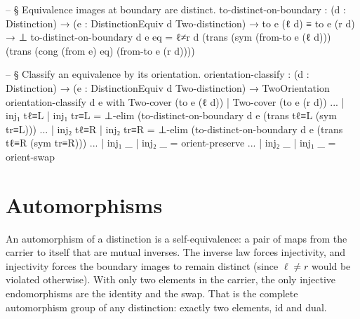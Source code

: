 \documentclass[11pt,a4paper]{book}
\def\texttt#1{#1}%
\begin{document}
\begin{code}
-- § Equivalence images at boundary are distinct.
to-distinct-on-boundary :
  (d : Distinction) →
  (e : DistinctionEquiv d Two-distinction) →
  to e (ℓ d) ≡ to e (r d) → ⊥
to-distinct-on-boundary d e eq =
  ℓ≠r d (trans (sym (from-to e (ℓ d))) (trans (cong (from e) eq) (from-to e (r d))))

-- § Classify an equivalence by its orientation.
orientation-classify :
  (d : Distinction) →
  (e : DistinctionEquiv d Two-distinction) →
  TwoOrientation
orientation-classify d e with Two-cover (to e (ℓ d)) | Two-cover (to e (r d))
... | inj₁ tℓ≡L | inj₁ tr≡L = ⊥-elim (to-distinct-on-boundary d e (trans tℓ≡L (sym tr≡L)))
... | inj₂ tℓ≡R | inj₂ tr≡R = ⊥-elim (to-distinct-on-boundary d e (trans tℓ≡R (sym tr≡R)))
... | inj₁ _ | inj₂ _ = orient-preserve
... | inj₂ _ | inj₁ _ = orient-swap
\end{code}

\section{Automorphisms}

An automorphism of a distinction is a self-equivalence: a pair of maps from the carrier to itself that are mutual inverses. The inverse law forces injectivity, and injectivity forces the boundary images to remain distinct (since $\ell \neq r$ would be violated otherwise). With only two elements in the carrier, the only injective endomorphisms are the identity and the swap. That is the complete automorphism group of any distinction: exactly two elements, \texttt{id} and \texttt{dual}.
\end{document}
